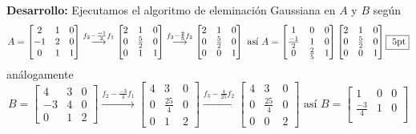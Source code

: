 \documentclass[11pt]{article}
\begin{document}
\begin{enumerate}
\textbf{Desarrollo:} Ejecutamos el algoritmo de eleminaci\'on Gaussiana en $A$ y $B$ seg\'un
$$
A=
	\begin{bmatrix}
    2 & 1 & 0 \\ 
    -1 & 2 & 0\\
    0 & 1 & 1
   	\end{bmatrix}
    \stackrel{f_2-\frac{-1}{2}f_1}{\longrightarrow}
    \begin{bmatrix}
    2 & 1 & 0 \\ 
    0 & \frac{5}{2} & 0\\
    0 & 1 & 1
   	\end{bmatrix}
        \stackrel{f_3-\frac{2}{5}f_2}{\longrightarrow}
    \begin{bmatrix}
    2 & 1 & 0 \\ 
    0 & \frac{5}{2} & 0\\
    0 & 0 & 1
   	\end{bmatrix}
    \text{ as\'i }
    A=
    \begin{bmatrix}
    1 & 0 & 0\\
    \frac{-1}{2} & 1 & 0\\
    0 & \frac{2}{5} & 1
    \end{bmatrix}
    \begin{bmatrix}
    2 & 1 & 0 \\ 
    0 & \frac{5}{2} & 0\\
    0 & 0 & 1
   	\end{bmatrix} \fbox{ 5pt}
$$
an\'alogamente
$$
B=
	\begin{bmatrix}
    4 & 3 & 0 \\
    -3 & 4 & 0\\
    0 & 1 & 2
    \end{bmatrix}
    \stackrel{f_2-\frac{-3}{4}f_1}{\longrightarrow}
    \begin{bmatrix}
    4 & 3 & 0 \\
    0 & \frac{25}{4} & 0\\
    0 & 1 & 2
   	\end{bmatrix}
    \stackrel{f_3-\frac{4}{25}f_2}{\longrightarrow}
    \begin{bmatrix}
    4 & 3 & 0 \\
    0 & \frac{25}{4} & 0\\
    0 & 0 & 2
   	\end{bmatrix}
    \text{ as\'i }
    B=
    \begin{bmatrix}
    1 & 0 & 0\\
    \frac{-3}{4} & 1 & 0\\

\end{bmatrix}$$
\end{enumerate}
\end{document}
